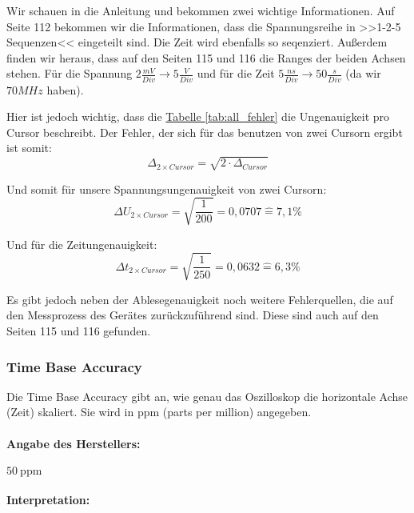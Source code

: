Wir schauen in die Anleitung \cite{CapJ} und bekommen zwei wichtige Informationen. Auf Seite 112 bekommen wir die Informationen, dass die Spannungsreihe in >>1-2-5 Sequenzen<< eingeteilt sind. Die Zeit wird ebenfalls so seqenziert.
Außerdem finden wir heraus, dass auf den Seiten 115 und 116 die Ranges der beiden Achsen stehen. 
Für die Spannung $2\frac{mV}{Div} \to 5\frac{V}{Div}$ und für die Zeit $5 \frac{ns}{Div} \to 50 \frac{s}{Div}$ (da wir $70MHz$ haben).

Hier ist jedoch wichtig, dass die \hyperref[tab:all_fehler]{Tabelle \ref*{tab:all_fehler}} die Ungenauigkeit pro Cursor beschreibt. 
Der Fehler, der sich für das benutzen von zwei Cursorn ergibt ist somit:
\begin{equation}
    \Delta_{2\times Cursor} = \sqrt{2 \cdot \Delta_{Cursor}}
\end{equation}

Und somit für unsere Spannungsungenauigkeit von zwei Cursorn:
\begin{equation}
    \Delta U_{2\times Cursor} = \sqrt{\frac{1}{200}} = 0,0707 \hat = 7,1\%
\end{equation}

Und für die Zeitungenauigkeit:
\begin{equation}
    \Delta t_{2\times Cursor} = \sqrt{\frac{1}{250}} = 0,0632 \hat = 6,3\%
\end{equation}

Es gibt jedoch neben der Ablesegenauigkeit noch weitere Fehlerquellen, die auf den Messprozess des Gerätes zurückzuführend sind. Diese sind auch auf den Seiten 115 und 116 gefunden. 

\subsubsection*{Time Base Accuracy}

Die Time Base Accuracy gibt an, wie genau das Oszilloskop die horizontale Achse (Zeit) skaliert. Sie wird in ppm (parts per million) angegeben. 

\paragraph{Angabe des Herstellers:} \(50~\text{ppm}\)

\paragraph{Interpretation:} 

